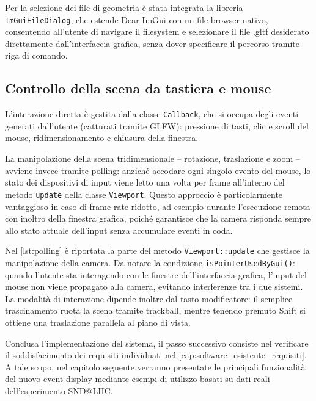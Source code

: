 Per la selezione dei file di geometria è stata integrata la libreria \texttt{ImGui\allowbreak{}FileDialog}, che estende Dear ImGui con un file browser nativo, consentendo all'utente di navigare il filesystem e selezionare il file .gltf desiderato direttamente dall'interfaccia grafica, senza dover specificare il percorso tramite riga di comando.

\subsection{Controllo della scena da tastiera e mouse}
L'interazione diretta è gestita dalla classe \texttt{Callback}, che si occupa degli eventi generati dall'utente (catturati tramite GLFW): pressione di tasti, clic e scroll del mouse, ridimensionamento e chiusura della finestra.

La manipolazione della scena tridimensionale -- rotazione, traslazione e zoom -- avviene invece tramite polling: anziché accodare ogni singolo evento del mouse, lo stato dei dispositivi di input viene letto una volta per frame all'interno del metodo \texttt{update} della classe \texttt{Viewport}.
Questo approccio è particolarmente vantaggioso in caso di frame rate ridotto, ad esempio durante l'esecuzione remota con inoltro della finestra grafica, poiché garantisce che la camera risponda sempre allo stato attuale dell'input senza accumulare eventi in coda.

Nel \cref{lst:polling} è riportata la parte del metodo \texttt{Viewport::update} che gestisce la manipolazione della camera.
Da notare la condizione \texttt{isPointer\allowbreak{}UsedByGui()}: quando l'utente sta interagendo con le finestre dell'interfaccia grafica, l'input del mouse non viene propagato alla camera, evitando interferenze tra i due sistemi.
La modalità di interazione dipende inoltre dal tasto modificatore: il semplice trascinamento ruota la scena tramite trackball, mentre tenendo premuto Shift si ottiene una traslazione parallela al piano di vista.



\bigskip
{}
Conclusa l'implementazione del sistema, il passo successivo consiste nel verificare il soddisfacimento dei requisiti individuati nel \cref{cap:software_esistente_requisiti}.
A tale scopo, nel capitolo seguente verranno presentate le principali funzionalità del nuovo event display mediante esempi di utilizzo basati su dati reali dell'esperimento SND@LHC.